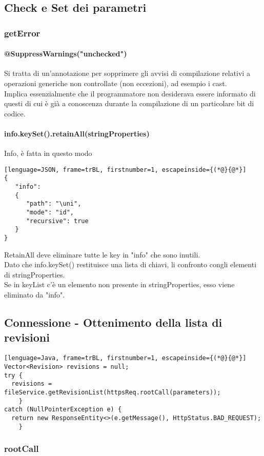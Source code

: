 \documentclass{article}
\begin{document}
\subsection{Check e Set dei parametri}
\subsubsection{getError}
\paragraph{@SuppressWarnings("unchecked")}
Si tratta di un'annotazione per sopprimere gli avvisi di compilazione relativi a operazioni generiche non controllate (non eccezioni), ad esempio i cast. \\ Implica essenzialmente che il programmatore non desiderava essere informato di questi di cui è già a conoscenza durante la compilazione di un particolare bit di codice.
\paragraph{info.keySet().retainAll(stringProperties)}
Info, è fatta in questo modo
\lstset{language=JSON}
\begin{lstlisting}[lenguage=JSON, frame=trBL, firstnumber=1, escapeinside={(*@}{@*}]
{
   "info":
   {
      "path": "\uni",
      "mode": "id",
      "recursive": true
   }
}
\end{lstlisting}
RetainAll deve eliminare tutte le key in "info" che sono inutili.\\
Dato che info.keySet() restituisce una lista di chiavi, li confronto congli elementi di stringProperties.\\
Se in keyList c'è un elemento non presente in stringProperties, esso viene eliminato da "info".
\subsection{Connessione - Ottenimento della lista di revisioni}
\begin{lstlisting}[lenguage=Java, frame=trBL, firstnumber=1, escapeinside={(*@}{@*}]
Vector<Revision> revisions = null;
try {
  revisions = fileService.getRevisionList(httpsReq.rootCall(parameters));
    }
catch (NullPointerException e) {
  return new ResponseEntity<>(e.getMessage(), HttpStatus.BAD_REQUEST);
	}
\end{lstlisting}
\subsubsection{rootCall}
\end{document}
